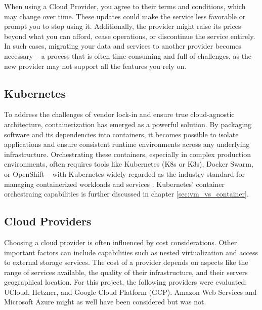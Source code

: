When using a Cloud Provider, you agree to their terms and conditions, which may change over time. These updates could make the service less favorable or prompt you to stop using it. Additionally, the provider might raise its prices beyond what you can afford, cease operations, or discontinue the service entirely. In such cases, migrating your data and services to another provider becomes necessary -- a process that is often time-consuming and full of challenges, as the new provider may not support all the features you rely on.

\subsection{Kubernetes}

To address the challenges of vendor lock-in and ensure true cloud-agnostic architecture, containerization has emerged as a powerful solution. By packaging software and its dependencies into containers, it becomes possible to isolate applications and ensure consistent runtime environments across any underlying infrastructure. Orchestrating these containers, especially in complex production environments, often requires tools like Kubernetes (K8s or K3s), Docker Swarm, or OpenShift -- with Kubernetes widely regarded as the industry standard for managing containerized workloads and services \Parencite{opsramp_kubernetes_origin}. Kubernetes' container orchestraing capabilities is further discussed in chapter \ref{sec:vm_vs_container}.

\subsection{Cloud Providers}\label{sec:cloud_providers}

Choosing a cloud provider is often influenced by cost considerations. Other important factors can include capabilities such as nested virtualization and access to external storage services. The cost of a provider depends on aspects like the range of services available, the quality of their infrastructure, and their servers geographical location. For this project, the following providers were evaluated: UCloud, Hetzner, and Google Cloud Platform (GCP). Amazon Web Services and Microsoft Azure might as well have been considered but was not. 

